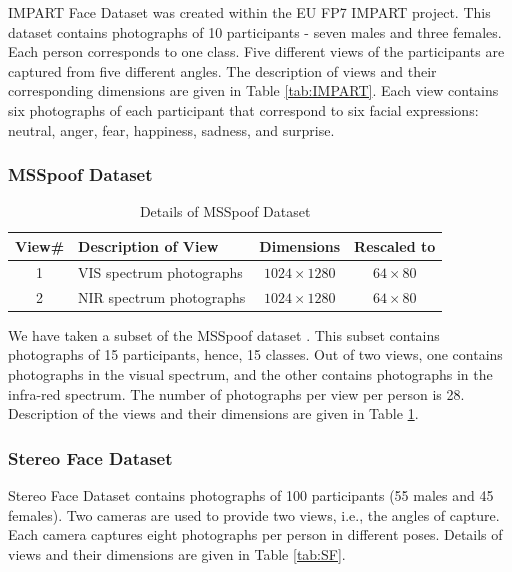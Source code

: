 \hspace{0.8cm}IMPART Face Dataset \cite{KimEBH18} was created within the EU FP7 IMPART project. This dataset contains photographs of 10 participants - seven males and three females. Each person corresponds to one class. Five different views of the participants are captured from five different angles. The description of views and their corresponding dimensions are given in Table \ref{tab:IMPART}. Each view contains six photographs of each participant that correspond to six facial expressions: neutral, anger, fear, happiness, sadness, and surprise.




\subsubsection{MSSpoof Dataset}
\begin{table}[t]
	\centering
	\caption{Details of MSSpoof Dataset}
	\label{tab:MSSpoof}
	\begin{tabular}{c l c c} \toprule
		
		\textbf{View\#} & \textbf{Description of View} & \textbf{Dimensions} & \textbf{Rescaled to} \\ \midrule
		1 & VIS spectrum photographs & $1024 \times 1280$ & $64 \times 80$ \\ 
		2 & NIR spectrum photographs & $1024 \times 1280$ & $64 \times 80$ \\ \bottomrule
			
	\end{tabular}
\end{table}

\hspace{0.8cm}We have taken a subset of the MSSpoof dataset \cite{ChingovskaEAM16}. This subset contains photographs of 15 participants, hence, 15 classes. Out of two views, one contains photographs in the visual spectrum, and the other contains photographs in the infra-red spectrum. The number of photographs per view per person is 28. Description of the views and their dimensions are given in Table \ref{tab:MSSpoof}.








\subsubsection{Stereo Face Dataset}
\hspace{0.8cm}Stereo Face Dataset \cite{FransensSG05} contains photographs of 100 participants (55 males and 45 females). Two cameras are used to provide two views, i.e., the angles of capture. Each camera captures eight photographs per person in different poses. Details of views and their dimensions are given in Table \ref{tab:SF}.


